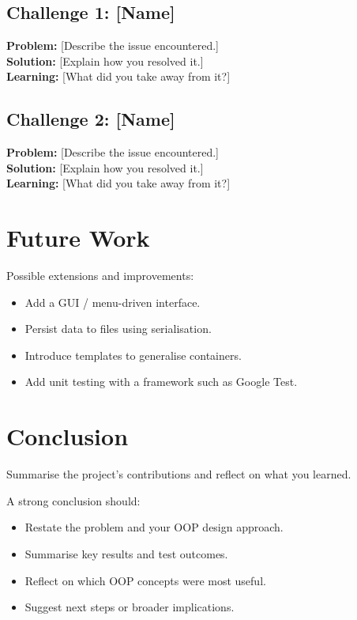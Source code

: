 \documentclass[11pt]{article}
\begin{document}
\subsection{Challenge 1: [Name]}
\textbf{Problem:} [Describe the issue encountered.]\\
\textbf{Solution:} [Explain how you resolved it.]\\
\textbf{Learning:} [What did you take away from it?]

\subsection{Challenge 2: [Name]}
\textbf{Problem:} [Describe the issue encountered.]\\
\textbf{Solution:} [Explain how you resolved it.]\\
\textbf{Learning:} [What did you take away from it?]

\section{Future Work}

Possible extensions and improvements:
\begin{itemize}
    \item Add a GUI / menu-driven interface.
    \item Persist data to files using serialisation.
    \item Introduce templates to generalise containers.
    \item Add unit testing with a framework such as Google Test.
\end{itemize}

\section{Conclusion}

Summarise the project's contributions and reflect on what you learned.

\begin{infobox}
A strong conclusion should:
\begin{itemize}
    \item Restate the problem and your OOP design approach.
    \item Summarise key results and test outcomes.
    \item Reflect on which OOP concepts were most useful.
    \item Suggest next steps or broader implications.
\end{itemize}
\end{infobox}
\end{document}
